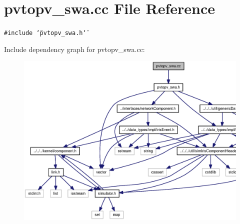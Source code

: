 \section{pvtopv\_\-swa.cc File Reference}
\label{pvtopv__swa_8cc}
{\tt \#include \char`\"{}pvtopv\_\-swa.h\char`\"{}}\par


Include dependency graph for pvtopv\_\-swa.cc:\nopagebreak
\begin{figure}[H]
\begin{center}
\leavevmode
\includegraphics[width=361pt]{pvtopv__swa_8cc__incl}
\end{center}
\end{figure}

